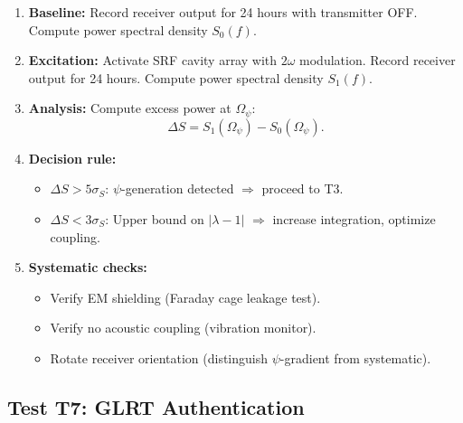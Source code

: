 \documentclass[11pt,onecolumn]{article}
\begin{document}
\begin{enumerate}
\item \textbf{Baseline:} Record receiver output for 24 hours with
transmitter OFF.
Compute power spectral density $S_0(f)$.

\item \textbf{Excitation:} Activate SRF cavity array with $2\omega$
modulation.
Record receiver output for 24 hours.
Compute power spectral density $S_1(f)$.

\item \textbf{Analysis:} Compute excess power at $\Omega_\psi$:
\begin{equation}
\Delta S = S_1(\Omega_\psi) - S_0(\Omega_\psi).
\end{equation}

\item \textbf{Decision rule:}
\begin{itemize}
\item $\Delta S > 5\sigma_S$: $\psi$-generation detected $\Rightarrow$
proceed to T3.
\item $\Delta S < 3\sigma_S$: Upper bound on $|\lambda - 1|$ $\Rightarrow$
increase integration, optimize coupling.
\end{itemize}

\item \textbf{Systematic checks:}
\begin{itemize}
\item Verify EM shielding (Faraday cage leakage test).
\item Verify no acoustic coupling (vibration monitor).
\item Rotate receiver orientation (distinguish $\psi$-gradient
from systematic).
\end{itemize}
\end{enumerate}

\subsection{Test T7: GLRT Authentication}
\end{document}
